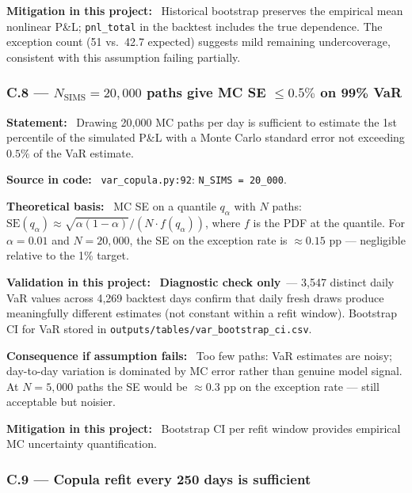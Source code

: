 \documentclass[11pt,a4paper]{article}
\newcommand{\asmfield}[1]{\medskip\noindent\textbf{#1:}\ }
\newcommand{\code}[1]{\texttt{#1}}
\newcommand{\diagnostic}{\textbf{Diagnostic check only}}
\begin{document}
\asmfield{Mitigation in this project}
Historical bootstrap preserves the empirical mean nonlinear P\&L;
\code{pnl\_total} in the backtest includes the true dependence. The
exception count (51 vs.\ 42.7 expected) suggests mild remaining
undercoverage, consistent with this assumption failing partially.

\subsubsection{C.8 --- $N_{\mathrm{SIMS}} = 20{,}000$ paths give MC SE $\le 0.5\%$ on 99\% VaR}\label{asm:C8}

\asmfield{Statement}
Drawing 20{,}000 MC paths per day is sufficient to estimate the 1st
percentile of the simulated P\&L with a Monte Carlo standard error not
exceeding $0.5\%$ of the VaR estimate.

\asmfield{Source in code}
\code{var\_copula.py:92}: \lstinline|N_SIMS = 20_000|.

\asmfield{Theoretical basis}
MC SE on a quantile $q_\alpha$ with $N$ paths:
$\text{SE}(q_\alpha) \approx \sqrt{\alpha(1-\alpha)} / (N \cdot f(q_\alpha))$,
where $f$ is the PDF at the quantile. For $\alpha = 0.01$ and $N = 20{,}000$,
the SE on the exception rate is $\approx 0.15$ pp --- negligible relative
to the 1\% target.

\asmfield{Validation in this project}
\diagnostic\ --- 3{,}547 distinct daily VaR values across 4{,}269 backtest
days confirm that daily fresh draws produce meaningfully different estimates
(not constant within a refit window). Bootstrap CI for VaR stored in
\code{outputs/tables/var\_bootstrap\_ci.csv}.

\asmfield{Consequence if assumption fails}
Too few paths: VaR estimates are noisy; day-to-day variation is dominated
by MC error rather than genuine model signal. At $N = 5{,}000$ paths the
SE would be $\approx 0.3$ pp on the exception rate --- still acceptable but
noisier.

\asmfield{Mitigation in this project}
Bootstrap CI per refit window provides empirical MC uncertainty quantification.

\subsubsection{C.9 --- Copula refit every 250 days is sufficient}\label{asm:C9}
\end{document}

